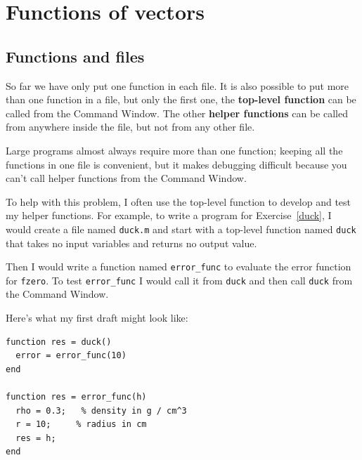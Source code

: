 \documentclass{book}
\begin{document}










\chapter{Functions of vectors}


\section{Functions and files}
\label{funfiles}

So far we have only put one function in each file. It is also
possible to put more than one function in a file, but only the first
one, the {\bf top-level function} can be called from the Command
Window. The other {\bf helper functions} can be called from anywhere
inside the file, but not from any other file.

Large programs almost always require more than one function; keeping
all the functions in one file is convenient, but it makes debugging
difficult because you can't call helper functions from the Command
Window.

To help with this problem, I often use the top-level function
to develop and test my helper functions. For example, to write
a program for Exercise~\ref{duck}, I would create a file named
{\tt duck.m} and start with a top-level function named {\tt duck}
that takes no input variables and returns no output value.

Then I would write a function named {\tt error\_func} to
evaluate the error function for {\tt fzero}. To test
{\tt error\_func} I would call it from {\tt duck} and then
call {\tt duck} from the Command Window.

Here's what my first draft might look like:

\begin{verbatim}
function res = duck()
  error = error_func(10)
end

function res = error_func(h)
  rho = 0.3;   % density in g / cm^3
  r = 10;     % radius in cm
  res = h;
end
\end{verbatim}
\end{document}
